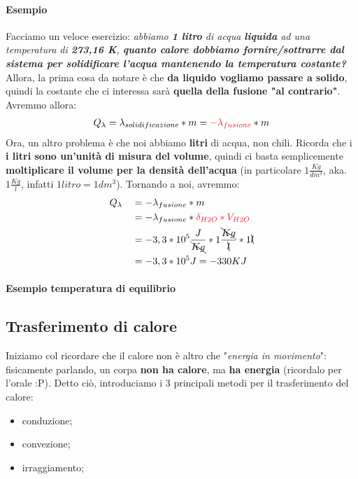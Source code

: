             \paragraph{Esempio}
                Facciamo un veloce esercizio: \textit{abbiamo \textbf{1 litro} di acqua \textbf{liquida} ad una temperatura di \textbf{273,16 K}, \textbf{quanto calore dobbiamo fornire/sottrarre dal sistema per solidificare l'acqua mantenendo la temperatura costante?}} \\
                Allora, la prima cosa da notare è che \textbf{da liquido vogliamo passare a solido}, quindi la costante che ci interessa sarà \textbf{quella della fusione "al contrario"}. Avremmo allora:
                \begin{align*}
                    Q_\lambda = \lambda_{solidificazione}*m=\textcolor{Red}{-\lambda_{fusione}}*m
                \end{align*}
                Ora, un altro problema è che noi abbiamo \textbf{litri} di acqua, non chili. Ricorda che i \textbf{i litri sono un'unità di misura del volume}, quindi ci basta semplicemente \textbf{moltiplicare il volume per la densità dell'acqua} (in particolare $1\frac{Kg}{dm^3}$, aka. $1\frac{Kg}{l}$, infatti $1 litro = 1 dm^3$). Tornando a noi, avremmo:
                \begin{align*}
                    &Q_\lambda &&= -\lambda_{fusione}*m\\
                    & &&= -\lambda_{fusione}*\textcolor{Red}{\delta_{H2O}*V_{H2O}}\\
                    & &&= -3,3 *10^5\frac{J}{\bcancel{Kg}}*1\frac{\bcancel{Kg}}{\bcancel{l}}*1\bcancel{l}\\
                    & &&= -3,3 *10^5J = -330 KJ
                \end{align*}

            \paragraph{Esempio temperatura di equilibrio}

    \subsection{Trasferimento di calore}
        Iniziamo col ricordare che il calore non è altro che "\textit{energia in movimento}": fisicamente parlando, un corpa \textbf{non ha calore}, ma \textbf{ha energia} (ricordalo per l'orale :P). Detto ciò, introduciamo i 3 principali metodi per il trasferimento del calore:
        \begin{itemize}
            \item conduzione;
            \item convezione;
            \item irraggiamento;
        \end{itemize}

